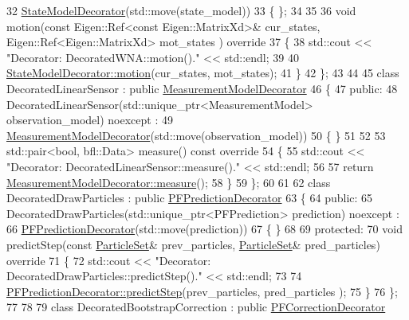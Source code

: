 \begin{DoxyCodeInclude}
32         \mbox{\hyperlink{classbfl_1_1StateModelDecorator}{StateModelDecorator}}(std::move(state\_model))
33     \{ \};
34 
35 
36     \textcolor{keywordtype}{void} motion(\textcolor{keyword}{const} Eigen::Ref<const Eigen::MatrixXd>& cur\_states, Eigen::Ref<Eigen::MatrixXd> mot\_states
      )\textcolor{keyword}{ override}
37 \textcolor{keyword}{    }\{
38         std::cout << \textcolor{stringliteral}{"Decorator: DecoratedWNA::motion()."} << std::endl;
39 
40         \mbox{\hyperlink{classbfl_1_1StateModelDecorator_af0ffeccf4bfcf8ddb36f3e6704fae7d2}{StateModelDecorator::motion}}(cur\_states, mot\_states);
41     \}
42 \};
43 
44 
45 \textcolor{keyword}{class }DecoratedLinearSensor : \textcolor{keyword}{public} \mbox{\hyperlink{classbfl_1_1MeasurementModelDecorator}{MeasurementModelDecorator}}
46 \{
47 \textcolor{keyword}{public}:
48     DecoratedLinearSensor(std::unique\_ptr<MeasurementModel> observation\_model) noexcept :
49         \mbox{\hyperlink{classbfl_1_1MeasurementModelDecorator}{MeasurementModelDecorator}}(std::move(observation\_model))
50     \{ \}
51 
52 
53     std::pair<bool, bfl::Data> measure()\textcolor{keyword}{ const override}
54 \textcolor{keyword}{    }\{
55         std::cout << \textcolor{stringliteral}{"Decorator: DecoratedLinearSensor::measure()."} << std::endl;
56 
57         \textcolor{keywordflow}{return} \mbox{\hyperlink{classbfl_1_1MeasurementModelDecorator_a36194c2f6abd7e13a417c3663febe921}{MeasurementModelDecorator::measure}}();
58     \}
59 \};
60 
61 
62 \textcolor{keyword}{class }DecoratedDrawParticles : \textcolor{keyword}{public} \mbox{\hyperlink{classbfl_1_1PFPredictionDecorator}{PFPredictionDecorator}}
63 \{
64 \textcolor{keyword}{public}:
65     DecoratedDrawParticles(std::unique\_ptr<PFPrediction> prediction) noexcept :
66         \mbox{\hyperlink{classbfl_1_1PFPredictionDecorator}{PFPredictionDecorator}}(std::move(prediction))
67     \{ \}
68 
69 \textcolor{keyword}{protected}:
70     \textcolor{keywordtype}{void} predictStep(\textcolor{keyword}{const} \mbox{\hyperlink{classbfl_1_1ParticleSet}{ParticleSet}}& prev\_particles, \mbox{\hyperlink{classbfl_1_1ParticleSet}{ParticleSet}}& pred\_particles)\textcolor{keyword}{
       override}
71 \textcolor{keyword}{    }\{
72         std::cout << \textcolor{stringliteral}{"Decorator: DecoratedDrawParticles::predictStep()."} << std::endl;
73 
74         \mbox{\hyperlink{classbfl_1_1PFPredictionDecorator_a570bd3a338034e65c1fa5abee429e717}{PFPredictionDecorator::predictStep}}(prev\_particles, pred\_particles
      );
75     \}
76 \};
77 
78 
79 \textcolor{keyword}{class }DecoratedBootstrapCorrection : \textcolor{keyword}{public} \mbox{\hyperlink{classbfl_1_1PFCorrectionDecorator}{PFCorrectionDecorator}}

\end{DoxyCodeInclude}
